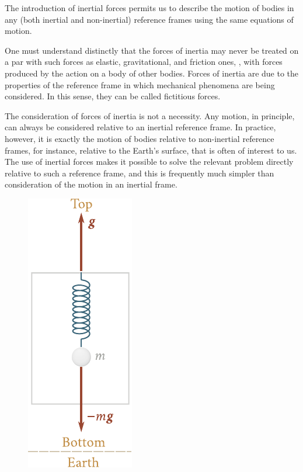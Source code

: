The introduction of inertial forces permits us to describe the motion of bodies in any (both inertial and non-inertial) reference frames using the same equations of motion.

One must understand distinctly that the forces of inertia may never be treated on a par with such forces as elastic, gravitational, and friction ones, \ie, with forces produced by the action on a body of other bodies. Forces of inertia are due to the properties of the reference frame in which mechanical phenomena are being considered. In this sense, they can be called fictitious forces.

The consideration of forces of inertia is not a necessity. Any motion, in principle, can always be considered relative to an inertial reference frame. In practice, however, it is exactly the motion of bodies relative to non-inertial reference frames, for instance, relative to the Earth's surface, that is often of interest to us. The use of inertial forces makes it possible to solve the relevant problem directly relative to such a reference frame, and this is frequently much simpler than consideration of the motion in an inertial frame.

\begin{figure}[t]
	\begin{center}
		\includegraphics[scale=0.85]{figures/ch_04/fig_4_2.pdf}
		\caption[]{}
		\label{fig:4_2}
	\end{center}
\vspace{-0.2cm}
\end{figure}

